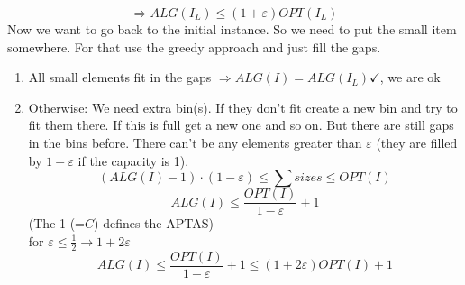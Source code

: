 $$\Rightarrow ALG(I_L) \leq (1+\varepsilon)OPT(I_L)$$
Now we want to go back to the initial instance. So we need to put the small item somewhere. For that use the greedy approach and just fill the gaps.
\begin{enumerate}
	\item All small elements fit in the gaps $\Rightarrow ALG(I) = ALG(I_L) \checkmark$, we are ok
	\item Otherwise: We need extra bin(s). If they don't fit create a new bin and try to fit them there. If this is full get a new one and so on. But there are still gaps in the bins before. There can't be any elements greater than $\varepsilon$ (they are filled by $1-\varepsilon$ if the capacity is 1).
	$$(ALG(I)-1) \cdot (1-\varepsilon) \leq \sum sizes \leq OPT(I)$$
	$$ALG(I) \leq \frac{OPT(I)}{1-\varepsilon}+1$$
	(The 1 (=$C$) defines the APTAS) \\
	for $\varepsilon \leq \frac{1}{2} \rightarrow 1 + 2 \varepsilon$
		$$ALG(I) \leq \frac{OPT(I)}{1-\varepsilon}+1 \leq (1+2\varepsilon)OPT(I) + 1$$
\end{enumerate}